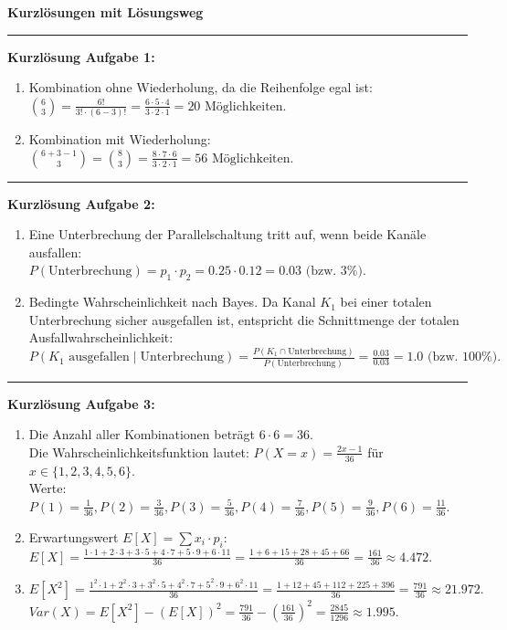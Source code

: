 \documentclass[11pt,a4paper]{article}
\begin{document}
\begin{center}
    \LARGE \textbf{Kurzlösungen mit Lösungsweg}
\end{center}
\hrule
\vspace{0.6cm}

\textbf{Kurzlösung Aufgabe 1:}
\begin{enumerate}
    \item[a)] Kombination ohne Wiederholung, da die Reihenfolge egal ist: \\
    $\binom{6}{3} = \frac{6!}{3! \cdot (6-3)!} = \frac{6 \cdot 5 \cdot 4}{3 \cdot 2 \cdot 1} = 20 \text{ Möglichkeiten.}$
    \item[b)] Kombination mit Wiederholung: \\
    $\binom{6+3-1}{3} = \binom{8}{3} = \frac{8 \cdot 7 \cdot 6}{3 \cdot 2 \cdot 1} = 56 \text{ Möglichkeiten.}$
\end{enumerate}

\hrule
\vspace{0.4cm}

\textbf{Kurzlösung Aufgabe 2:}
\begin{enumerate}
    \item[a)] Eine Unterbrechung der Parallelschaltung tritt auf, wenn beide Kanäle ausfallen: \\
    $P(\text{Unterbrechung}) = p_1 \cdot p_2 = 0.25 \cdot 0.12 = 0.03 \text{ (bzw. 3\%)}.$
    \item[b)] Bedingte Wahrscheinlichkeit nach Bayes. Da Kanal $K_1$ bei einer totalen Unterbrechung sicher ausgefallen ist, entspricht die Schnittmenge der totalen Ausfallwahrscheinlichkeit: \\
    $P(K_1 \text{ ausgefallen} \mid \text{Unterbrechung}) = \frac{P(K_1 \cap \text{Unterbrechung})}{P(\text{Unterbrechung})} = \frac{0.03}{0.03} = 1.0 \text{ (bzw. 100\%)}.$
\end{enumerate}

\hrule
\vspace{0.4cm}

\textbf{Kurzlösung Aufgabe 3:}
\begin{enumerate}
    \item[a)] Die Anzahl aller Kombinationen beträgt $6 \cdot 6 = 36$. \\
    Die Wahrscheinlichkeitsfunktion lautet: $P(X=x) = \frac{2x-1}{36}$ für $x \in \{1, 2, 3, 4, 5, 6\}$. \\
    Werte: $P(1)=\frac{1}{36}, P(2)=\frac{3}{36}, P(3)=\frac{5}{36}, P(4)=\frac{7}{36}, P(5)=\frac{9}{36}, P(6)=\frac{11}{36}.$
    \item[b)] Erwartungswert $E[X] = \sum x_i \cdot p_i$: \\
    $E[X] = \frac{1\cdot1 + 2\cdot3 + 3\cdot5 + 4\cdot7 + 5\cdot9 + 6\cdot11}{36} = \frac{1 + 6 + 15 + 28 + 45 + 66}{36} = \frac{161}{36} \approx 4.472$.
    \item[c)] $E[X^2] = \frac{1^2\cdot1 + 2^2\cdot3 + 3^2\cdot5 + 4^2\cdot7 + 5^2\cdot9 + 6^2\cdot11}{36} = \frac{1 + 12 + 45 + 112 + 225 + 396}{36} = \frac{791}{36} \approx 21.972.$ \\
    $Var(X) = E[X^2] - (E[X])^2 = \frac{791}{36} - \left(\frac{161}{36}\right)^2 = \frac{2845}{1296} \approx 1.995.$
\end{enumerate}
\end{document}
